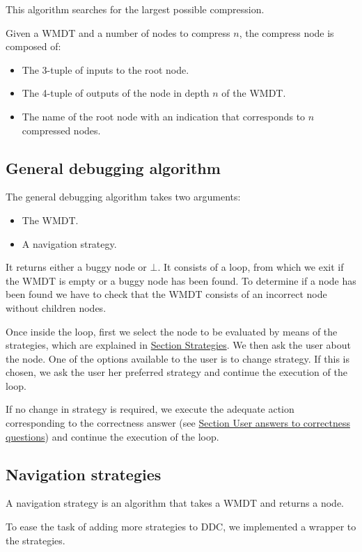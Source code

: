 This algorithm searches for the largest possible compression.

Given a WMDT and a number of nodes to compress \(n\), the compress node is composed of:
\begin{itemize}
    \item The 3-tuple of inputs to the root node.
    \item The 4-tuple of outputs of the node in depth \(n\) of the WMDT.
    \item The name of the root node with an indication that corresponds to \(n\) compressed nodes.
\end{itemize}

\subsection{General debugging algorithm}
The general debugging algorithm takes two arguments:
\begin{itemize}
    \item The WMDT.
    \item A navigation strategy.
\end{itemize}
It returns either a buggy node or \(\bot\).
It consists of a loop, from which we exit if the WMDT is empty or a buggy node has been found.
To determine if a node has been found we have to check that the WMDT consists of an incorrect node without children nodes.

Once inside the loop, first we select the node to be evaluated by means of the strategies, which are explained in \hyperref[architecture:Strategies]{Section Strategies}.
We then ask the user about the node. One of the options available to the user is to change strategy. If this is chosen, we ask the user her preferred strategy and continue the execution of the loop.

If no change in strategy is required, we execute the adequate action corresponding to the correctness answer (see \hyperref[architecture:correctnessAnswers]{Section User answers to correctness questions}) and continue the execution of the loop.

\subsection{Navigation strategies}
\label{architecture:Strategies}
A navigation strategy is an algorithm that takes a WMDT and returns a node.

To ease the task of adding more strategies to DDC, we implemented a wrapper to the strategies.

